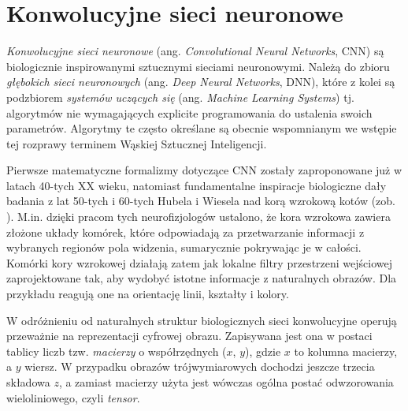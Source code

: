 \chapter{Konwolucyjne sieci neuronowe}
\label{CNNs}
\textit{Konwolucyjne sieci neuronowe} (ang. \textit{Convolutional Neural Networks}, CNN) \linebreak są biologicznie inspirowanymi sztucznymi sieciami neuronowymi. Należą do zbioru \textit{głębokich sieci neuronowych} (ang. \textit{Deep Neural Networks}, DNN), które z kolei są podzbiorem \textit{systemów uczących się} (ang. \textit{Machine Learning Systems}) tj. algorytmów nie wymagających explicite programowania do ustalenia swoich parametrów. Algorytmy te często określane są obecnie wspomnianym we wstępie tej rozprawy terminem Wąskiej Sztucznej Inteligencji.

Pierwsze matematyczne formalizmy dotyczące CNN zostały zaproponowane już w latach 40-tych XX wieku, natomiast fundamentalne inspiracje biologiczne dały badania z lat 50-tych i 60-tych Hubela i Wiesela nad korą wzrokową kotów (zob. \cite{Wurtz2009}). M.in. dzięki pracom tych neurofizjologów ustalono, że kora wzrokowa zawiera złożone układy komórek, które odpowiadają za przetwarzanie informacji \linebreak z wybranych regionów pola widzenia, sumarycznie pokrywając je w całości. Komórki kory wzrokowej działają zatem jak lokalne filtry przestrzeni wejściowej zaprojektowane tak, aby wydobyć istotne informacje z naturalnych obrazów. Dla przykładu reagują one na orientację linii, kształty i kolory.

W odróżnieniu od naturalnych struktur biologicznych sieci konwolucyjne operują przeważnie na reprezentacji cyfrowej obrazu. Zapisywana jest ona w postaci tablicy liczb tzw. \textit{macierzy} o współrzędnych ($x$, $y$), gdzie $x$ to kolumna macierzy, a \linebreak $y$ wiersz. W przypadku obrazów trójwymiarowych dochodzi jeszcze trzecia składowa $z$, a zamiast macierzy użyta jest wówczas ogólna postać odwzorowania wieloliniowego, czyli \textit{tensor}.

